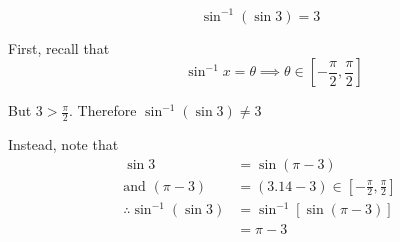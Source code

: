 \documentclass[14pt,fleqn]{extarticle}
\begin{document}
 
\begin{snippet}
    
    \incorrect
    
    \[ \sin^{-1} \left(\sin 3 \right) = 3 \]
    
    \reason
    
    First, recall that 
    \[\qquad \sin^{-1} x =\theta \implies \theta\in \left[-\frac\pi{2},\frac{\pi}{2} \right]\]
    
    But $ 3 > \frac\pi{2}$. Therefore $\sin^{-1} \left(\sin 3 \right)\neq 3$\newline 
    
    Instead, note that 
    \begin{align}
	\sin 3 &= \sin \left(\pi -3 \right) \\
	\text{and } \left(\pi-3 \right) &= \left(3.14-3 \right)\in \left[-\frac\pi{2},\frac\pi{2} \right] \\
	\therefore\sin^{-1} \left(\sin 3 \right) &= \sin^{-1} \left[\sin \left(\pi-3 \right) \right] \\
	&= \pi - 3 
\end{align}
    
\end{snippet} 
\end{document}
